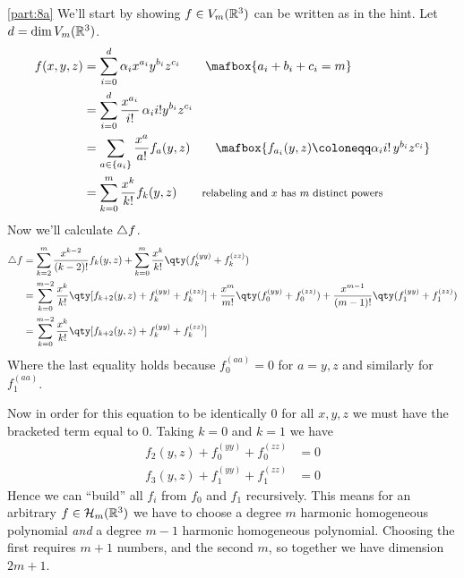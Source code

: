 \documentclass[
	pages,
	boxes,
	color=WildStrawberry
]{homework}
\begin{document}
\begin{solution}
	\ref{part:8a}
	We'll start by showing $f\in V_m(\mathbb{R}^3)$ can be written as in the hint. Let $d = \dim V_m(\mathbb{R}^3)$.
	\begin{align*}
		f(x, y, z) & = \sum_{i = 0}^{d}\alpha_i x^{a_i}y^{b_i}z^{c_i} \tag*{$\mafbox{a_i + b_i + c_i = m}$}                               \\
		           & = \sum_{i = 0}^{d}\frac{x^{a_i}}{i!}\,\alpha_i i! y^{b_i}z^{c_i}                                                     \\
		           & = \sum_{a\in \{a_i\}} \frac{x^{a}}{a!}f_a (y, z) \tag*{$\mafbox{f_{a_i} (y, z)\defeq\alpha_i i! \, y^{b_i}z^{c_i}}$} \\
		           & = \sum_{k = 0}^{m}\frac{x^k}{k!}f_k(y, z) \tag*{\footnotesize{relabeling and $x$ has $m$ distinct powers}}
	\end{align*}
	Now we'll calculate $\triangle{f}$.
	\begin{align*}
		\laplace{f} & = \sum_{k = 2}^{m}\frac{x^{k - 2}}{(k - 2)!}f_k(y, z) + \sum_{k = 0}^m\frac{x^k}{k!}\qty(f_k^{(yy)} + f_k^{(zz)})                                                                           \\
		            & = \sum_{k = 0}^{m - 2}\frac{x^k}{k!}\qty[f_{k + 2}(y, z) + f_k^{(yy)} + f_k^{(zz)}] + \frac{x^m}{m!}\qty(f_0^{(yy)} + f_0^{(zz)}) + \frac{x^{m - 1}}{(m - 1)!}\qty(f_1^{(yy)} + f_1^{(zz)}) \\
		            & = \sum_{k = 0}^{m - 2}\frac{x^k}{k!}\qty[f_{k + 2}(y, z) + f_k^{(yy)} + f_k^{(zz)}]
	\end{align*}
	Where the last equality holds because $f_0^{(aa)} = 0$ for $a = y, z$ and similarly for $f_1^{(aa)}$.

	Now in order for this equation to be identically 0 for all $x, y, z$ we must have the bracketed term equal to 0. Taking $k = 0$ and $k = 1$ we have
	\begin{align*}
		f_2(y, z) + f_0^{(yy)} + f_0^{(zz)} & = 0 \\
		f_3(y, z) + f_1^{(yy)} + f_1^{(zz)} & = 0
	\end{align*}
	Hence we can ``build'' all $f_i$ from $f_0$ and $f_1$ recursively. This means for an arbitrary $f\in\mathcal{H}_m(\mathbb{R}^3)$ we have to choose a degree $m$ harmonic homogeneous polynomial \emph{and} a degree $m - 1$ harmonic homogeneous polynomial. Choosing the first requires $m + 1$ numbers, and the second $m$, so together we have dimension $2m + 1$.


\end{solution}
\end{document}
